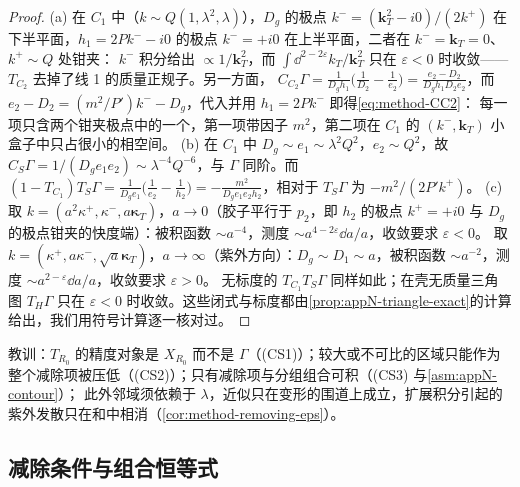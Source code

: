 \begin{proof}
(a) 在 $C_1$ 中（$k\sim Q(1,\lambda^2,\lambda)$），$D_g$ 的极点 $k^-=(\mathbf k_T^2-i0)/(2k^+)$ 在下半平面，$h_1=2Pk^--i0$ 的极点 $k^-=+i0$ 在上半平面，二者在 $k^-=\mathbf k_T=0$、$k^+\sim Q$ 处钳夹：
$k^-$ 积分给出 $\propto1/\mathbf k_T^2$，而 $\int\dd^{2-2\varepsilon}k_T/\mathbf k_T^2$ 只在 $\varepsilon<0$ 时收敛——$T_{C_2}$ 去掉了线 1 的质量正规子。另一方面，
$C_{C_2}\Gamma=\frac1{D_gh_1}\bigl(\frac1{D_2}-\frac1{e_2}\bigr)=\frac{e_2-D_2}{D_gh_1D_2e_2}$，而 $e_2-D_2=(m^2/P')k^--D_g$，代入并用 $h_1=2Pk^-$ 即得\cref{eq:method-CC2}：
每一项只含两个钳夹极点中的一个，第一项带因子 $m^2$，第二项在 $C_1$ 的 $(k^-,\mathbf k_T)$ 小盒子中只占很小的相空间。
(b) 在 $C_1$ 中 $D_g\sim e_1\sim\lambda^2Q^2$，$e_2\sim Q^2$，故 $C_S\Gamma=1/(D_ge_1e_2)\sim\lambda^{-4}Q^{-6}$，与 $\Gamma$ 同阶。而
$(1-T_{C_1})T_S\Gamma=\frac1{D_ge_1}\bigl(\frac1{e_2}-\frac1{h_2}\bigr)=-\frac{m^2}{D_ge_1e_2h_2}$，相对于 $T_S\Gamma$ 为 $-m^2/(2P'k^+)$。
(c) 取 $k=(a^2\kappa^+,\kappa^-,a\boldsymbol\kappa_T)$，$a\to0$（胶子平行于 $p_2$，即 $h_2$ 的极点 $k^+=+i0$ 与 $D_g$ 的极点钳夹的快度端）：被积函数 $\sim a^{-4}$，测度 $\sim a^{4-2\varepsilon}\dd a/a$，收敛要求 $\varepsilon<0$。
取 $k=(\kappa^+,a\kappa^-,\sqrt a\boldsymbol\kappa_T)$，$a\to\infty$（紫外方向）：$D_g\sim D_1\sim a$，被积函数 $\sim a^{-2}$，测度 $\sim a^{2-\varepsilon}\dd a/a$，收敛要求 $\varepsilon>0$。
无标度的 $T_{C_1}T_S\Gamma$ 同样如此；在壳无质量三角图 $T_H\Gamma$ 只在 $\varepsilon<0$ 时收敛。这些闭式与标度都由\cref{prop:appN-triangle-exact}的计算给出，我们用符号计算逐一核对过。%
\end{proof}

教训：$T_{R_0}$ 的精度对象是 $X_{R_0}$ 而不是 $\Gamma$（(CS1)）；较大或不可比的区域只能作为整个减除项被压低（(CS2)）；只有减除项与分组组合可积（(CS3) 与\cref{asm:appN-contour}）；
此外邻域须依赖于 $\lambda$，近似只在变形的围道上成立，扩展积分引起的紫外发散只在和中相消（\cref{cor:method-removing-eps}）。

\subsection{减除条件与组合恒等式}

